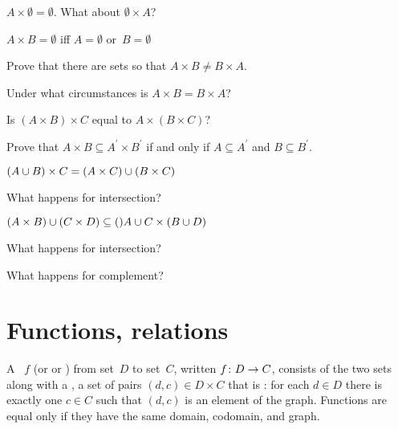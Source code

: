 \documentclass{ibl}
\begin{document}
\begin{ex}
\begin{exes}
\item $A\times \emptyset=\emptyset$.
  What about $\emptyset\times A$?
\item $A\times B=\emptyset$ iff $A=\emptyset$ or~$B=\emptyset$
\item Prove that there are sets so that $A\times B\neq B\times A$.
\item Under what circumstances is $A\times B=B\times A$?
\item Is $(A\times B)\times C$ equal to $A\times (B\times C)$?
\item Prove that $A\times B\subseteq A^\prime\times B^\prime$ if and only if
  $A\subseteq A^\prime$ and $B\subseteq B^\prime$.
\end{exes}
\end{ex}

\begin{ex} 
\begin{exes}
\item $(A\cup B)\times C=(A\times C)\cup(B\times C)$
\item What happens for intersection?
\item $(A\times B)\cup (C\times D)\subseteq ()A\cup C\times (B\cup D)$
\item What happens for intersection?
\item What happens for complement?
\end{exes}
\end{ex}











\chapter{Functions, relations}
\begin{df}
A ~$f$ (or  or ) 
from  set~$D$
to  set~$C$, written $\mbox{$f\colon D\to C$}$,
consists of the two sets along with a , 
a set of pairs $(d,c)\in D\times C$ that is 
: for each $d\in D$ there is
exactly one $c\in C$ such that $(d,c)$ is an element of the graph. 
Functions are equal only if they have the same domain, codomain,
and graph.
\end{df}
\end{document}
